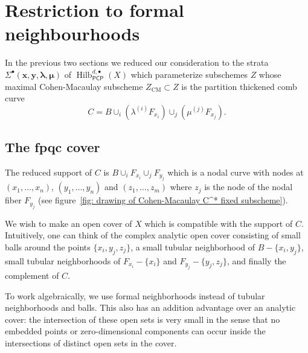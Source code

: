 \documentclass{amsart}
\theoremstyle{definition}
\newcommand{\Hilb}{\operatorname{Hilb}}
\newcommand{\CM}{\operatorname{CM}}
\newcommand{\boldx}{\boldsymbol{x}}
\newcommand{\boldy}{\boldsymbol{y}}
\newcommand{\boldlambda}{\boldsymbol{\lambda }}
\newcommand{\boldmu}{\boldsymbol{\mu }}
\newcommand{\Sigmaxylambdamu}{\Sigma^{\bullet }(\boldx ,\boldy ,\boldlambda ,\boldmu )}
\newcommand{\PCP}{\mathsf{PCP}}
\begin{document}
\section{Restriction to formal neighbourhoods} \label{formal}

In the previous two sections we reduced our consideration to the
strata $\Sigmaxylambdamu $
of $ \Hilb^{d,\bullet}_{\PCP }(X)$ which parameterize subschemes $Z$ whose maximal
Cohen-Macaulay subscheme $Z_{\CM} \subset Z$ is the partition
thickened comb curve 
\[
C=B\cup_{i}(\lambda^{(i)}F_{x_{i}})\cup_{j}(\mu^{(j)}F_{x_{j}}).
\]

\subsection{The fpqc cover}\label{subsec: the fpqc cover}
The reduced support of $C$ is $B\cup_{i}F_{x_{i}}\cup_{j}F_{y_{j}}$
which is a nodal curve with nodes at $(x_{1},\dotsc ,x_{n})$,
$(y_{1},\dotsc ,y_{n})$ and $(z_{1},\dotsc ,z_{m})$ where $z_{j}$ is
the node of the nodal fiber $F_{y_{j}}$ (see figure~\ref{fig: drawing
of Cohen-Macaulay C^* fixed subscheme}).

We wish to make an open cover of $X$ which is compatible with the
support of $C$. Intuitively, one can think of the complex analytic
open cover consisting of small balls around the points
$\{x_{i},y_{j},z_{j} \}$, a small tubular neighborhood of
$B-\{x_{i},y_{j} \}$, small tubular neighborhoods of
$F_{x_{i}}-\{x_{i} \}$ and $F_{y_{j}}-\{y_{j},z_{j} \}$, and finally
the complement of $C$.

To work algebraically, we use formal neighborhoods instead of tubular
neighborhoods and balls. This also has an addition advantage over an
analytic cover: the intersection of these open sets is very small in
the sense that no embedded points or zero-dimensional components can
occur inside the intersections of distinct open sets in the cover.
\end{document}
